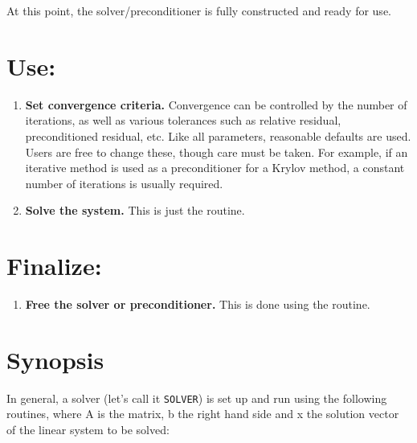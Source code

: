 At this point, the solver/preconditioner is fully constructed and
ready for use.


\section*{Use:}

\begin{enumerate}

\item
{\bf Set convergence criteria.}  Convergence can be controlled by the
number of iterations, as well as various tolerances such as relative
residual, preconditioned residual, etc.  Like all parameters,
reasonable defaults are used.  Users are free to change these, though
care must be taken.  For example, if an iterative method is used as a
preconditioner for a Krylov method, a constant number of iterations is
usually required.

\item
{\bf Solve the system.}  This is just the  routine.

\end{enumerate}


\section*{Finalize:}

\begin{enumerate}

\item
{\bf Free the solver or preconditioner.} This is done using the
 routine.

\end{enumerate}


\section* {Synopsis}

In general, a solver (let's call it {\tt SOLVER}) is set up and run using the following routines,
where A is the matrix, b the right hand side and x the solution vector
of the linear system to be solved:

